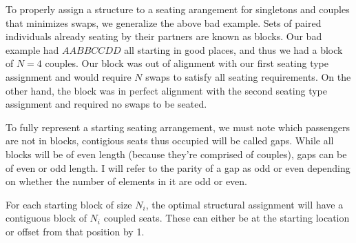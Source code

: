 To properly assign a structure to a seating arangement for singletons and couples that minimizes swaps, we generalize the above bad example.  Sets of paired individuals already seating by their partners are known as blocks.  Our bad example had $AABBCCDD$ all starting in good places, and thus we had a block of $N = 4$ couples.  Our block was out of alignment with our first seating type assignment and would require $N$ swaps to satisfy all seating requirements.  On the other hand, the block was in perfect alignment with the second seating type assignment and required no swaps to be seated.

\begin{figure}[H]
\centering
{}
\end{figure}

To fully represent a starting seating arrangement, we must note which passengers are not in blocks, contigious seats thus occupied will be called gaps.  While all blocks will be of even length (because they're comprised of couples), gaps can be of even or odd length.  I will refer to the parity of a gap as odd or even depending on whether the number of elements in it are odd or even.

\begin{lem} \label{lemma:ParityOnly}
For each starting block of size $N_i$, the optimal structural assignment will have a contiguous block of $N_i$ coupled seats. These can either be at the starting location or offset from that position by 1.
\end{lem}

